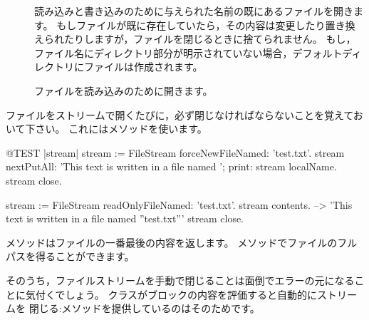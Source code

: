 \documentclass[a4paper,10pt,twoside]{book}
\begin{document}
{\begin{description}
\item[] 読み込みと書き込みのために与えられた名前の既にあるファイルを開きます。
  もしファイルが既に存在していたら，その内容は変更したり置き換えられたりしますが，ファイルを閉じるときに捨てられません。
  もし，ファイル名にディレクトリ部分が明示されていない場合，デフォルトディレクトリにファイルは作成されます。

\item[] ファイルを読み込みのために開きます。


\end{description}

ファイルをストリームで開くたびに，必ず閉じなければならないことを覚えておいて下さい。
これにはメソッドを使います。


\begin{code}{@TEST |stream|}
stream := FileStream forceNewFileNamed: 'test.txt'.
stream
    nextPutAll: 'This text is written in a file named ';
    print: stream localName.
stream close.

stream := FileStream readOnlyFileNamed: 'test.txt'.
stream contents. --> 'This text is written in a file named ''test.txt'''
stream close.
\end{code}

%

メソッドはファイルの一番最後の内容を返します。
メソッドでファイルのフルパスを得ることができます。


そのうち，ファイルストリームを手動で閉じることは面倒でエラーの元になることに気付くでしょう。
クラスがブロックの内容を評価すると自動的にストリームを
閉じる:メソッドを提供しているのはそのためです。


}
\end{document}
